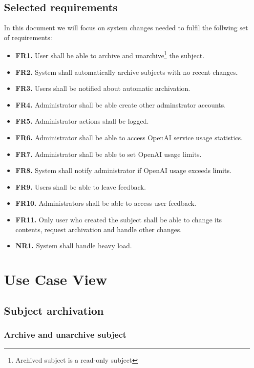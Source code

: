 \documentclass[
    english, %
]{VUMIFPSkursinis}
\begin{document}
\subsection{Selected requirements}
In this document we will focus on system changes needed to fulfil the follwing set of requirements:

\begin{itemize}
    \item \textbf{FR1.} User shall be able to archive and unarchive\footnote{Archived subject is a read-only subject} the subject.
    \item \textbf{FR2.} System shall automatically archive subjects with no recent changes.
    \item \textbf{FR3.} Users shall be notified about automatic archivation.
    \item \textbf{FR4.} Administrator shall be able create other adminstrator accounts.
    \item \textbf{FR5.} Administrator actions shall be logged.
    \item \textbf{FR6.} Administrator shall be able to access OpenAI service usage statistics.
    \item \textbf{FR7.} Administrator shall be able to set OpenAI usage limits.
    \item \textbf{FR8.} System shall notify administrator if OpenAI usage exceeds limits.
    \item \textbf{FR9.} Users shall be able to leave feedback.
    \item \textbf{FR10.} Administrators shall be able to access user feedback.
    \item \textbf{FR11.} Only user who created the subject shall be able to change its contents, request archivation and handle other changes.
    \item \textbf{NR1.} System shall handle heavy load.
\end{itemize}

\section{Use Case View}

\subsection{Subject archivation}

\subsubsection{Archive and unarchive subject}
\end{document}
